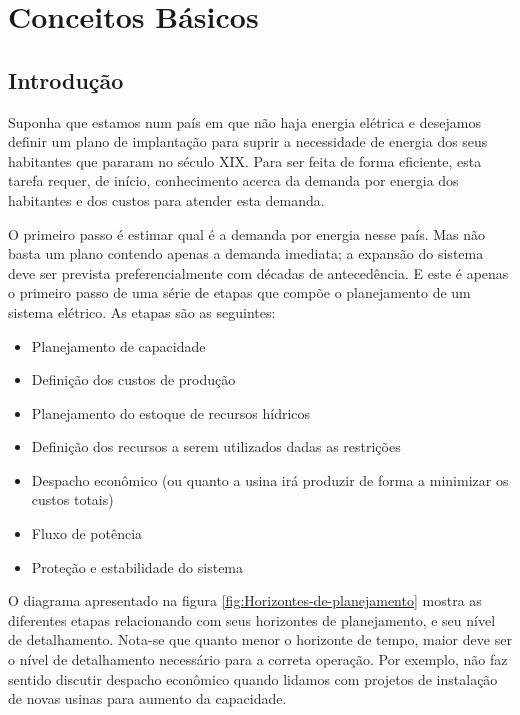 \section{Conceitos Básicos}

\subsection{Introdução}


Suponha que estamos num país em que não haja energia elétrica e desejamos
definir um plano de implantação para suprir a necessidade de energia
dos seus habitantes que pararam no século XIX. Para ser feita de forma eficiente, esta tarefa requer, de início, conhecimento acerca da demanda por energia dos habitantes e dos custos para atender esta demanda.

O primeiro passo é estimar qual é a demanda por energia nesse país.
Mas não basta um plano contendo apenas a demanda imediata; a expansão do sistema deve ser prevista preferencialmente com décadas de antecedência. E este é apenas o primeiro passo de uma série de etapas que compõe o planejamento de um sistema elétrico. As etapas são as seguintes: 
\begin{itemize}
\item Planejamento de capacidade
\item Definição dos custos de produção
\item Planejamento do estoque de recursos hídricos
\item Definição dos recursos a serem utilizados dadas as restrições
\item Despacho econômico (ou quanto a usina irá produzir de forma a minimizar os custos totais)
\item Fluxo de potência
\item Proteção e estabilidade do sistema
\end{itemize}

O diagrama apresentado na figura \ref{fig:Horizontes-de-planejamento} mostra as diferentes etapas relacionando com seus horizontes de planejamento, e seu nível de detalhamento. Nota-se que quanto menor o horizonte de tempo, maior deve ser o nível de detalhamento necessário para a correta operação. Por exemplo, não faz sentido discutir despacho econômico quando lidamos com projetos de instalação de novas usinas para aumento da capacidade.

